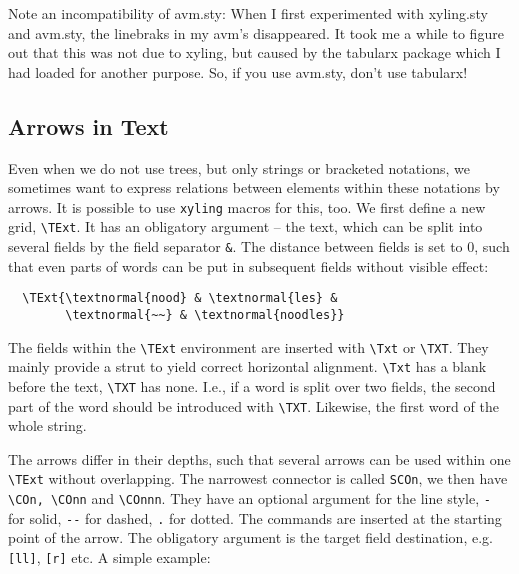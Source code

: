 \documentclass[12pt,a4paper]{article}
\begin{document}
Note an incompatibility of avm.sty: When I first experimented with xyling.sty and
avm.sty, the linebraks in my avm's disappeared. It took me a while to figure out that
this was not due to xyling, but caused by the tabularx package which I had loaded for
another purpose. So, if you use avm.sty, don't use tabularx!

\subsection{Arrows in Text}
\label{sec:text}

Even when we do not use trees, but only strings or bracketed notations, we
sometimes want to express relations between elements within these notations by
arrows. It is possible to use \texttt{xyling} macros for this, too. We first
define a new grid, \verb|\TExt|. It has an obligatory argument -- the text,
which can be split into several fields by the field separator \verb|&|. The
distance between fields is set to 0, such that even parts of words can be put in
subsequent fields without visible effect:

\begin{minipage}[t]{3cm} 
\end{minipage}  
\begin{minipage}[t]{8cm} 
\begin{verbatim}
  \TExt{\textnormal{nood} & \textnormal{les} & 
        \textnormal{~~} & \textnormal{noodles}}\end{verbatim}
\end{minipage}

The fields within the \verb|\TExt| environment are inserted with \verb|\Txt| or 
\verb|\TXT|. They mainly provide a strut to yield correct horizontal alignment. 
\verb|\Txt| has a blank before the text, \verb|\TXT| has none. I.e., if a word
is split over two fields, the second part of the word should be introduced with 
\verb|\TXT|.  Likewise, the first word of the whole string.

The arrows differ in their depths, such that several arrows can be used within
one \verb|\TExt| without overlapping. The narrowest connector is called
\verb|SCOn|, we then have \verb|\COn, \COnn| and \verb|\COnnn|. They have an
optional argument for the line style, \verb|-| for solid, \verb|--| for dashed,
\verb|.| for dotted. The commands are inserted at the starting point of the
arrow. The obligatory argument is the target field destination, e.g.
\texttt{[ll]}, \texttt{[r]} etc. A simple example:
\end{document}
